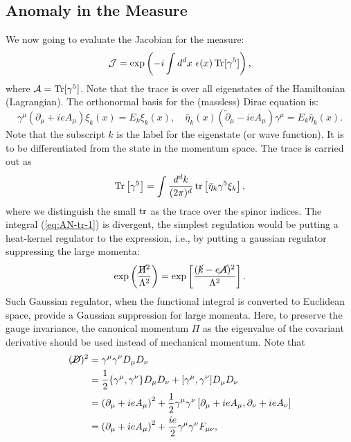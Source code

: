 \subsection{Anomaly in the Measure}

We now going to evaluate the Jacobian for the measure:
\begin{equation}
	\mathcal J = \exp\left(-i \int d^d x \ \epsilon(x) \Tr[\gamma^5] \right),
\end{equation}
where $\mathcal A = \operatorname{Tr}[\gamma^5]$.
Note that the trace is over all eigenstates of the Hamiltonian (Lagrangian).
The orthonormal basis for the (massless) Dirac equation is:
\begin{equation}
	\gamma^\mu (\partial_\mu + ie A_\mu ) \xi_k(x) = E_k \xi_k(x), \quad
	\bar\eta_k(x) \left(\overleftarrow\partial_\mu -ieA_\mu\right) \gamma^\mu = E_k \bar\eta_k(x).
\end{equation}
Note that the subscript $k$ is the label for the eigenstate (or wave function).
It is to be differentiated from the state in the momentum space.
The trace is carried out as
\begin{equation}\label{eq:AN-tr-1}
	\operatorname{Tr}\left[\gamma^5\right] 
	= \int \frac{d^d k}{(2\pi)^d} \operatorname{tr}\left[\bar\eta_k \gamma^5 \xi_k \right],
\end{equation}
where we distinguish the small $\operatorname{tr}$ as the trace over the spinor indices. 
The integral (\ref{eq:AN-tr-1}) is divergent, the simplest regulation would be putting a heat-kernel regulator to the expression, i.e., by putting a gaussian regulator suppressing the large momenta:
\begin{equation}
	\exp\left(\frac{\cancel{\Pi}^2}{\Lambda^2}\right)
	= \exp\left[\frac{(\cancel{k}-e\cancel{A})^2}{\Lambda^2}\right].
\end{equation}
Such Gaussian regulator, when the functional integral is converted to Euclidean space, provide a Gaussian suppression for large momenta.
Here, to preserve the gauge invariance, the canonical momentum $\Pi$ as the eigenvalue of the covariant derivative should be used instead of mechanical momentum. 
Note that
\begin{equation}
\begin{aligned}
	(\cancel D)^2 &= \gamma^\mu \gamma^\nu {D}_\mu {D}_\nu \\
	&= \frac{1}{2} \{\gamma^\mu,\gamma^\nu\} {D}_\mu {D}_\nu + [\gamma^\mu,\gamma^\nu] {D}_\mu {D}_\nu \\
	&= \left(\partial_\mu+ie A_\mu \right)^2 + \frac{1}{2} \gamma^\mu \gamma^\nu \left[\partial_\mu+ie A_\mu, \partial_\nu+ie A_\nu \right] \\
	&= \left(\partial_\mu+ie A_\mu \right)^2 + \frac{ie}{2}\gamma^\mu \gamma^\nu F_{\mu\nu},
\end{aligned}
\end{equation}
